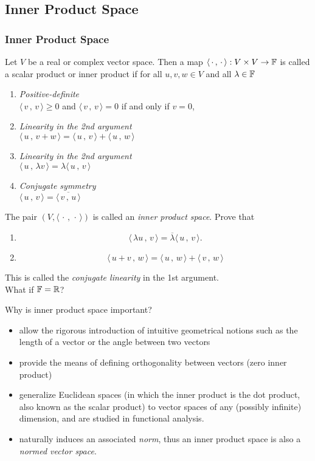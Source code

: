 \documentclass[12pt, t]{beamer}
\renewcommand{\emph}[1]{{\color{Turquoise3}\textsl{#1}}}
\newcommand{\nullspace}{~\\[15pt]}
\newcommand{\scp}[2]{\langle\,#1\,,\,#2\,\rangle} \newcommand{\scpp}{\langle\,\cdot\,,\,\cdot\,\rangle}
\begin{document}
\subsection{Inner Product Space}
\begin{frame}[allowframebreaks]
    \frametitle{Inner Product Space}
    Let $V$ be a real or complex vector space. Then a map $\langle\,\cdot\,,\,\cdot\,\rangle: V\times V\rightarrow\mathbb{F}$ is called a scalar product or inner product if for all $u,v,w\in V$ and all $\lambda\in\mathbb{F}$
    \begin{enumerate}
        \item \textit{Positive-definite}\\ $\scp{v}{v}\geq0$ and $\scp{v}{v}=0$ if and only if $v=0$,
        \item \textit{Linearity in the 2nd argument}\\ $\scp{u}{v+w}=\scp{u}{v}+\scp{u}{w}$
        \item \textit{Linearity in the 2nd argument}\\ $\scp{u}{\lambda v}=\lambda\scp{u}{v}$
        \item \textit{Conjugate symmetry}\\ $\scp{u}{v}=\overline{\scp{v}{u}}$
    \end{enumerate}
    The pair $(V,\scpp)$ is called an \emph{inner product space}.
    \newpage
    Prove that
    \begin{enumerate}
        \item \[\scp{\lambda u}{v}=\overline{\lambda}\scp{u}{v}.\]
        \item \[\scp{u+v}{w}=\scp{u}{w}+\scp{v}{w}\]
    \end{enumerate}
    This is called the \emph{conjugate linearity} in the 1st argument.
    \nullspace
    What if $\mathbb{F}=\mathbb{R}$?

    \newpage
    Why is inner product space important?
    \nullspace
    \begin{itemize}
        \item allow the rigorous introduction of intuitive geometrical notions such as the length of a vector or the angle between two vectors
        \item provide the means of defining orthogonality between vectors (zero inner product)
        \item generalize Euclidean spaces (in which the inner product is the dot product, also known as the scalar product) to vector spaces of any (possibly infinite) dimension, and are studied in functional analysis.
        \item  naturally induces an associated \emph{norm}, thus an inner product space is also a \emph{normed vector space}.
    \end{itemize}
\end{frame}
\end{document}
